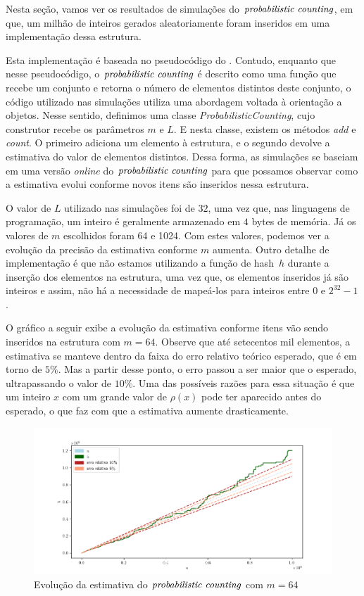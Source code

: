 Nesta seção, vamos ver os resultados de simulações do $\textit{probabilistic counting}$, em que, um milhão de inteiros gerados 
aleatoriamente foram inseridos em uma implementação dessa estrutura. 

Esta implementação é baseada no pseudocódigo do . Contudo, enquanto que 
nesse pseudocódigo, o $\textit{probabilistic counting}$ é descrito como uma função que recebe um conjunto e retorna o número de elementos 
distintos deste conjunto, o código utilizado nas simulações utiliza uma abordagem voltada à orientação a objetos. Nesse 
sentido, definimos uma classe \textit{ProbabilisticCounting}, cujo construtor recebe os parâmetros $m$ e $L$. E nesta 
classe, existem os métodos \textit{add} e \textit{count}. O primeiro adiciona um elemento à estrutura, e o segundo 
devolve a estimativa do valor de elementos distintos. Dessa forma, as simulações se baseiam em uma versão 
\textit{online} do $\textit{probabilistic counting}$ para que possamos observar como a estimativa evolui conforme novos itens são inseridos 
nessa estrutura.

O valor de $L$ utilizado nas simulações foi de $32$, uma vez que, nas linguagens de programação, um inteiro é geralmente 
armazenado em $4$ bytes de memória. Já os valores de $m$ escolhidos foram 64 e 1024. Com estes valores, podemos ver 
a evolução da precisão da estimativa conforme $m$ aumenta. Outro detalhe de implementação é que não estamos utilizando a 
função de hash~$h$ durante a inserção dos elementos na estrutura, uma vez que, os elementos inseridos já são inteiros e 
assim, não há a necessidade de mapeá-los para inteiros entre $0$ e $2^{32} - 1$.

O gráfico a seguir exibe a evolução da estimativa conforme itens vão sendo inseridos na estrutura com $m = 64$. Observe 
que até setecentos mil elementos, a estimativa se manteve dentro da faixa do erro relativo teórico esperado, que é em 
torno de $5\%$. Mas a partir desse ponto, o erro passou a ser maior que o esperado, ultrapassando o valor de $10\%$. 
Uma das possíveis razões para essa situação é que um inteiro $x$ com um grande valor de $\rho(x)$ pode ter aparecido 
antes do esperado, o que faz com que a estimativa aumente drasticamente.

\begin{figure}
  \centering
  \includegraphics[scale=0.50]{figuras/pcounting-estimate-64.png}
	\caption{Evolução da estimativa do $\textit{probabilistic counting}$ com $m = 64$}
  \label{fig:pcounting:64}
\end{figure}

